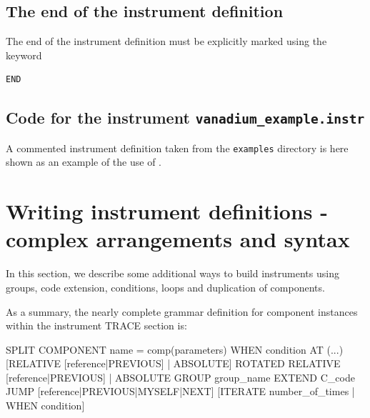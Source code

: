 \subsection{The end of the instrument definition}
\label{s:end}

The end of the instrument definition must be explicitly marked using the keyword
\begin{lstlisting}
END
\end{lstlisting}

\subsection{Code for the instrument \texttt{vanadium\_example.instr}}
\label{s:Samples_vanadium.instr}
A commented instrument definition taken from the \texttt{examples} directory is
here shown as an example of the use of \MCS .



\section{Writing instrument definitions - complex arrangements and syntax}
\label{s:instrdefs-extend}

In this section, we describe some additional ways to build instruments using
groups, code extension, conditions, loops and duplication of components.

As a summary, the nearly complete grammar definition for component instances
within the instrument TRACE section is:

\begin{mcstas}
{SPLIT} COMPONENT name = comp(parameters) {WHEN condition}
  AT (...) [RELATIVE [reference|PREVIOUS] | ABSOLUTE]
  {ROTATED {RELATIVE [reference|PREVIOUS] | ABSOLUTE} }
  {GROUP group_name}
  {EXTEND C_code}
  {JUMP [reference|PREVIOUS|MYSELF|NEXT] [ITERATE number_of_times | WHEN condition] }
\end{mcstas}

